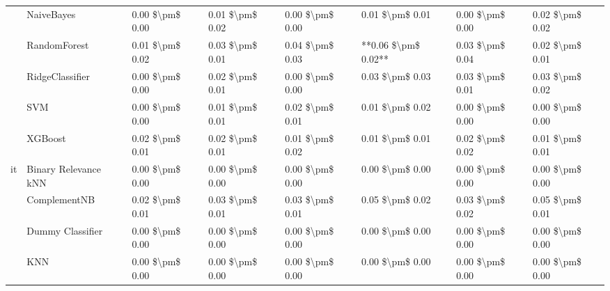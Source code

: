 \begin{tabular}{llllllll}
   & NaiveBayes &  0.00 \$\textbackslash pm\$ 0.00 &           0.01 \$\textbackslash pm\$ 0.02 &       0.00 \$\textbackslash pm\$ 0.00 &        0.01 \$\textbackslash pm\$ 0.01 &                         0.00 \$\textbackslash pm\$ 0.00 &      0.02 \$\textbackslash pm\$ 0.02 \\
   & RandomForest &  0.01 \$\textbackslash pm\$ 0.02 &           0.03 \$\textbackslash pm\$ 0.01 &       0.04 \$\textbackslash pm\$ 0.03 &    **0.06 \$\textbackslash pm\$ 0.02** &                         0.03 \$\textbackslash pm\$ 0.04 &      0.02 \$\textbackslash pm\$ 0.01 \\
   & RidgeClassifier &  0.00 \$\textbackslash pm\$ 0.00 &           0.02 \$\textbackslash pm\$ 0.01 &       0.00 \$\textbackslash pm\$ 0.00 &        0.03 \$\textbackslash pm\$ 0.03 &                         0.03 \$\textbackslash pm\$ 0.01 &      0.03 \$\textbackslash pm\$ 0.02 \\
   & SVM &  0.00 \$\textbackslash pm\$ 0.00 &           0.01 \$\textbackslash pm\$ 0.01 &       0.02 \$\textbackslash pm\$ 0.01 &        0.01 \$\textbackslash pm\$ 0.02 &                         0.00 \$\textbackslash pm\$ 0.00 &      0.00 \$\textbackslash pm\$ 0.00 \\
   & XGBoost &  0.02 \$\textbackslash pm\$ 0.01 &           0.02 \$\textbackslash pm\$ 0.01 &       0.01 \$\textbackslash pm\$ 0.02 &        0.01 \$\textbackslash pm\$ 0.01 &                         0.02 \$\textbackslash pm\$ 0.02 &      0.01 \$\textbackslash pm\$ 0.01 \\
it & Binary Relevance kNN &  0.00 \$\textbackslash pm\$ 0.00 &           0.00 \$\textbackslash pm\$ 0.00 &       0.00 \$\textbackslash pm\$ 0.00 &        0.00 \$\textbackslash pm\$ 0.00 &                         0.00 \$\textbackslash pm\$ 0.00 &      0.00 \$\textbackslash pm\$ 0.00 \\
   & ComplementNB &  0.02 \$\textbackslash pm\$ 0.01 &           0.03 \$\textbackslash pm\$ 0.01 &       0.03 \$\textbackslash pm\$ 0.01 &        0.05 \$\textbackslash pm\$ 0.02 &                         0.03 \$\textbackslash pm\$ 0.02 &      0.05 \$\textbackslash pm\$ 0.01 \\
   & Dummy Classifier &  0.00 \$\textbackslash pm\$ 0.00 &           0.00 \$\textbackslash pm\$ 0.00 &       0.00 \$\textbackslash pm\$ 0.00 &        0.00 \$\textbackslash pm\$ 0.00 &                         0.00 \$\textbackslash pm\$ 0.00 &      0.00 \$\textbackslash pm\$ 0.00 \\
   & KNN &  0.00 \$\textbackslash pm\$ 0.00 &           0.00 \$\textbackslash pm\$ 0.00 &       0.00 \$\textbackslash pm\$ 0.00 &        0.00 \$\textbackslash pm\$ 0.00 &                         0.00 \$\textbackslash pm\$ 0.00 &      0.00 \$\textbackslash pm\$ 0.00 \\

\end{tabular}
